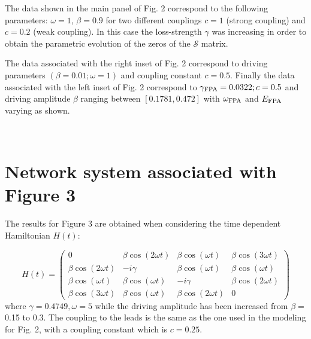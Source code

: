 \documentclass[aps,prl,twocolumn,showpacs,groupedaddress,amsmath,amssymb]{revtex4}
\begin{document}
The data shown in the main panel of Fig. 2 correspond to the following parameters: $\omega = 1$, $\beta = 0.9$ for  
two different couplings $c = 1$ (strong coupling) and $c=0.2$ (weak coupling). In this case the loss-strength $\gamma$
was increasing in order to obtain the parametric evolution of the zeros of the $\mathcal{S}$ matrix.

The data associated with the right inset of Fig. 2 correspond to driving parameters $(\beta=0.01; \omega=1)$ and coupling constant 
$c=0.5$. Finally the data associated with the left inset of Fig. 2 correspond to $\gamma_{\rm FPA} =0.0322; c = 0.5$ and driving amplitude 
$\beta$ ranging between $[0.1781, 0.472]$ with $\omega_{\rm FPA}$ and $E_{\rm FPA}$ varying as shown.

\


\section{Network system associated with Figure 3}

The results for Figure 3 are obtained when considering the time dependent Hamiltonian $H(t)$:

\begin{equation}
H (t) = \left(\begin{array}{cccc}
  0 & \beta \cos (2 \omega t) & \beta \cos (\omega t) & \beta \cos (3 \omega
  t)\\
  \beta \cos (2 \omega t) & - i \gamma & \beta \cos (\omega t) & \beta \cos
  (\omega t)\\
  \beta \cos (\omega t) & \beta \cos (\omega t) & - i \gamma & \beta \cos (2
  \omega t)\\
  \beta \cos (3 \omega t) & \beta \cos (\omega t) & \beta \cos (2 \omega t) &
  0
\end{array}\right)
\end{equation}
where $\gamma=0.4749, \omega = 5$ while the driving amplitude has been increased from $\beta =$0.15 to
0.3. The coupling to the leads is the same as the one used in the modeling for Fig. 2, with a coupling constant which is $c=0.25$.


\endgroup
\end{document}
